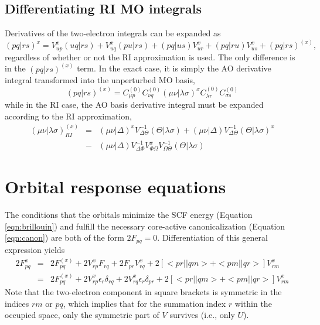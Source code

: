 \documentclass[fleqn,12pt]{article}
\newcommand{\bra}{<\!}
\newcommand{\ket}{\!>}
\newcommand{\Fx}{F^{(x)}}
\newcommand{\Czero}{C^{(0)}}
\begin{document}
\begin{changebar}
\subsection{Differentiating RI MO integrals}

Derivatives of the two-electron integrals can be expanded as
\begin{equation}
( pq | rs )^{x} = V^{x}_{up} ( uq | rs ) + V^{x}_{uq} ( pu | rs )
                     + ( pq | us ) V^{x}_{ur} + ( pq | ru) V^{x}_{us}
                     + ( pq | rs )^{(x)},
\end{equation}
regardless of whether or not the RI approximation is used.  The only
difference is in the $( pq | rs )^{(x)}$ term.  In the exact case, it
is simply the AO derivative integral transformed into the unperturbed
MO basis,
\begin{equation}
( pq | rs )^{(x)} = \Czero_{\mu p} \Czero_{\nu q} 
                    (\mu \nu | \lambda \sigma )^{x}
                    \Czero_{\lambda r} \Czero_{\sigma s}
\end{equation}
while in the RI case, the AO basis derivative integral must be
expanded according to the RI approximation,
\begin{eqnarray}
\label{eqn:riaoderivint}
( \mu\nu | \lambda\sigma )^{(x)}_{RI} & = &
   (\mu \nu | \Delta)^{x} V^{-1}_{\Delta\Theta} (\Theta | \lambda \sigma)
   + (\mu \nu | \Delta) V^{-1}_{\Delta\Theta} (\Theta | \lambda \sigma)^{x} \\
 & - & (\mu \nu | \Delta) V^{-1}_{\Delta\Phi} V^{x}_{\Phi\Omega}
             V^{-1}_{\Omega\Theta} (\Theta | \lambda \sigma) \nonumber
\end{eqnarray}
\end{changebar}

\section{Orbital response equations}

The conditions that the orbitals minimize the SCF energy (Equation
\ref{eqn:brillouin}) and fulfill the necessary core-active canonicalization
(Equation \ref{eqn:canon}) are both of the form $2F_{pq} = 0$.
Differentiation of this general expression yields
\begin{eqnarray}
  2F^x_{pq} & = & 2\Fx_{pq} + 2V^x_{rp}F_{rq} + 2F_{pr}V^x_{rq} +
  2\left[ \bra pr||qm \ket + \bra pm||qr \ket \right] V^x_{rm} \\
    & = & 2\Fx_{pq} + 2V^x_{rp} \epsilon_r \delta_{rq} + 
   2V^x_{rq} \epsilon_r \delta_{pr} +
  2\left[ \bra pr||qm \ket + \bra pm||qr \ket \right] V^x_{rm}
\end{eqnarray}
Note that the two-electron component in square brackets is symmetric
in the indices $rm$ or $pq$, which implies that for the summation
index $r$ within the occupied space, only the symmetric part of $V$
survives (i.e., only $U$).
\end{document}
